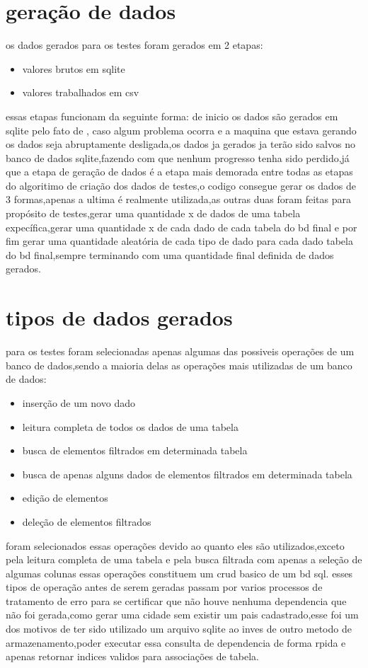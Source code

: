 \documentclass[
	12pt,				%
	openright,			%
	oneside,			%
	a4paper,			%
	english,			%
	french,				%
	spanish,			%
	brazil,				%
	]{abntex2}
\begin{document}
\section{geração de dados}
\label{sec:geração de dados}
os dados gerados para os testes foram gerados em 2 etapas:
\begin{itemize}
\item valores brutos em sqlite
\item valores trabalhados em csv
\end{itemize}
essas etapas funcionam da seguinte forma:\newline
de inicio os dados são gerados em sqlite pelo fato de , caso algum problema ocorra e a maquina que estava gerando os dados seja abruptamente desligada,os dados ja gerados ja terão sido salvos no banco de dados sqlite,fazendo com que nenhum progresso tenha sido perdido,já que a etapa de geração de dados é a etapa mais demorada entre todas as etapas do algoritimo de criação dos dados de testes,o codigo consegue gerar os dados de 3 formas,apenas a ultima é realmente utilizada,as outras duas foram feitas para propósito de testes,gerar uma quantidade x de dados de uma tabela expecífica,gerar uma quantidade x de cada dado de cada tabela do bd final e por fim gerar uma quantidade aleatória de cada tipo de dado para cada dado tabela do bd final,sempre terminando com uma quantidade final definida de dados gerados.\newline

\section{tipos de dados gerados}
\label{sec:tipos de dados gerados}
para os testes foram selecionadas apenas algumas das possiveis operações de um banco de dados,sendo a maioria delas as operações mais utilizadas de um banco de dados:
\begin{itemize}
\item inserção de um novo dado
\item leitura completa de todos os dados de uma tabela
\item busca de elementos filtrados em determinada tabela
\item busca de apenas alguns dados de elementos filtrados em determinada tabela
\item edição de elementos
\item deleção de elementos filtrados
\end{itemize}
foram selecionados essas operações devido ao quanto eles são utilizados,exceto pela leitura completa de uma tabela e pela busca filtrada com apenas a seleção de algumas colunas essas operações constituem um crud basico de um bd sql.\newline
esses tipos de operação antes de serem geradas passam por varios processos de tratamento de erro para se certificar que não houve nenhuma dependencia que não foi gerada,como gerar uma cidade sem existir um pais cadastrado,esse foi um dos motivos de ter sido utilizado um arquivo sqlite ao inves de outro metodo de armazenamento,poder executar essa consulta de dependencia de forma rpida e apenas retornar indices validos para associações de tabela.
\end{document}
